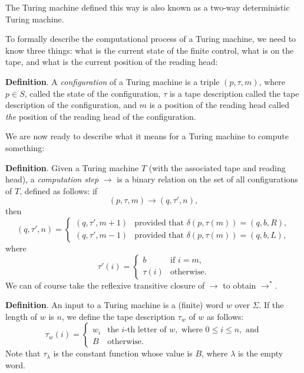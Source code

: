 \documentclass[12pt]{article}
\begin{document}
The Turing machine defined this way is also known as a two-way deterministic Turing machine.

To formally describe the computational process of a Turing machine, we need to know three things: what is the current state of the finite control, what is on the tape, and what is the current position of the reading head:

\textbf{Definition}.  A \emph{configuration} of a Turing machine is a triple $(p,\tau,m)$, where $p \in S$, called the state of the configuration, $\tau$ is a tape description called the tape description of the configuration, and $m$ is a position of the reading head called \emph{the} position of the reading head of the configuration.

We are now ready to describe what it means for a Turing machine to compute something:

\textbf{Definition}.  Given a Turing machine $T$ (with the associated tape and reading head), a \emph{computation step} $\rightarrow$ is a binary relation on the set of all configurations of $T$, defined as follows: if 
$$(p,\tau,m)\rightarrow (q,\tau',n),$$ then 
\begin{displaymath}
(q,\tau',n)= \left\{
\begin{array}{ll}
(q,\tau',m+1) & \textrm{provided that } \delta(p,\tau(m))=(q,b,R), \\
(q,\tau',m-1) & \textrm{provided that } \delta(p,\tau(m))=(q,b,L),
\end{array}
\right.
\end{displaymath}
where 
\begin{displaymath}
\tau'(i)= \left\{
\begin{array}{ll}
b & \textrm{if } i=m, \\
\tau(i) & \textrm{otherwise.}
\end{array}
\right.
\end{displaymath}
We can of course take the reflexive transitive closure of $\rightarrow$ to obtain $\rightarrow^*$.

\textbf{Definition}.  An input to a Turing machine is a (finite) word $w$ over $\Sigma$.  If the length of $w$ is $n$, we define the tape description $\tau_w$ of $w$ as follows: 
\begin{displaymath}
\tau_w(i)= \left\{
\begin{array}{ll}
w_i & \textrm{the $i$-th letter of } w, \mbox{ where }0\le i\le n, \mbox{ and}\\
B & \textrm{otherwise.}
\end{array}
\right.
\end{displaymath}
Note that $\tau_{\lambda}$ is the constant function whose value is $B$, where $\lambda$ is the empty word.
\end{document}
